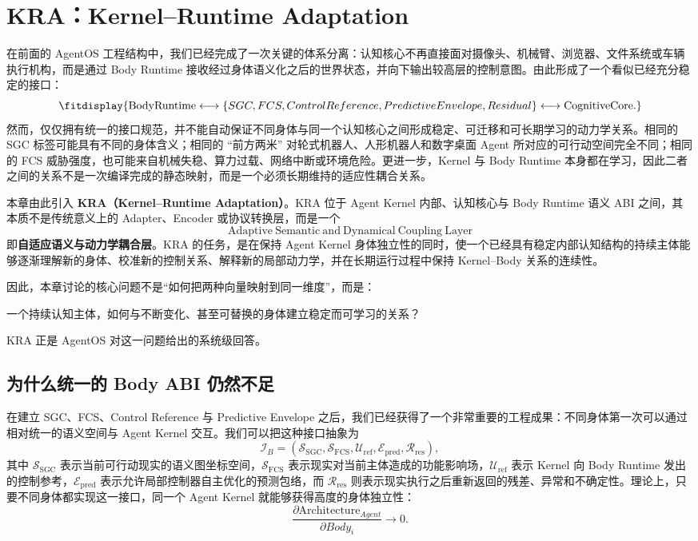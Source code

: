 \chapter{KRA：Kernel--Runtime Adaptation}
\label{chap:kra}

\begin{chapterlead}
在前面的 AgentOS 工程结构中，我们已经完成了一次关键的体系分离：认知核心不再直接面对摄像头、机械臂、浏览器、文件系统或车辆执行机构，而是通过 Body Runtime 接收经过身体语义化之后的世界状态，并向下输出较高层的控制意图。由此形成了一个看似已经充分稳定的接口：
\[
\fitdisplay{
\mathrm{BodyRuntime}
\longleftrightarrow
\{SGC,FCS,ControlReference,PredictiveEnvelope,Residual\}
\longleftrightarrow
\mathrm{CognitiveCore}.
}
\]
然而，仅仅拥有统一的接口规范，并不能自动保证不同身体与同一个认知核心之间形成稳定、可迁移和可长期学习的动力学关系。相同的 SGC 标签可能具有不同的身体含义；相同的 ``前方两米'' 对轮式机器人、人形机器人和数字桌面 Agent 所对应的可行动空间完全不同；相同的 FCS 威胁强度，也可能来自机械失稳、算力过载、网络中断或环境危险。更进一步，Kernel 与 Body Runtime 本身都在学习，因此二者之间的关系不是一次编译完成的静态映射，而是一个必须长期维持的适应性耦合关系。

本章由此引入 \textbf{KRA（Kernel--Runtime Adaptation）}。KRA 位于 Agent Kernel 内部、认知核心与 Body Runtime 语义 ABI 之间，其本质不是传统意义上的 Adapter、Encoder 或协议转换层，而是一个
\[
\boxed{
\mathrm{Adaptive\ Semantic\ and\ Dynamical\ Coupling\ Layer}
}
\]
即\textbf{自适应语义与动力学耦合层}。KRA 的任务，是在保持 Agent Kernel 身体独立性的同时，使一个已经具有稳定内部认知结构的持续主体能够逐渐理解新的身体、校准新的控制关系、解释新的局部动力学，并在长期运行过程中保持 Kernel--Body 关系的连续性。

因此，本章讨论的核心问题不是``如何把两种向量映射到同一维度''，而是：
\begin{statementbox}
一个持续认知主体，如何与不断变化、甚至可替换的身体建立稳定而可学习的关系？
\end{statementbox}
KRA 正是 AgentOS 对这一问题给出的系统级回答。
\end{chapterlead}

\section{为什么统一的 Body ABI 仍然不足}
\label{sec:kra-why-abi-insufficient}

在建立 SGC、FCS、Control Reference 与 Predictive Envelope 之后，我们已经获得了一个非常重要的工程成果：不同身体第一次可以通过相对统一的语义空间与 Agent Kernel 交互。我们可以把这种接口抽象为
\[
\mathcal I_B
=
\left(
\mathcal S_{\mathrm{SGC}},
\mathcal S_{\mathrm{FCS}},
\mathcal U_{\mathrm{ref}},
\mathcal E_{\mathrm{pred}},
\mathcal R_{\mathrm{res}}
\right),
\]
其中 $\mathcal S_{\mathrm{SGC}}$ 表示当前可行动现实的语义图坐标空间，$\mathcal S_{\mathrm{FCS}}$ 表示现实对当前主体造成的功能影响场，$\mathcal U_{\mathrm{ref}}$ 表示 Kernel 向 Body Runtime 发出的控制参考，$\mathcal E_{\mathrm{pred}}$ 表示允许局部控制器自主优化的预测包络，而 $\mathcal R_{\mathrm{res}}$ 则表示现实执行之后重新返回的残差、异常和不确定性。理论上，只要不同身体都实现这一接口，同一个 Agent Kernel 就能够获得高度的身体独立性：
\[
\frac{\partial \mathrm{Architecture}_{Agent}}
{\partial Body_i}
\rightarrow 0.
\]

